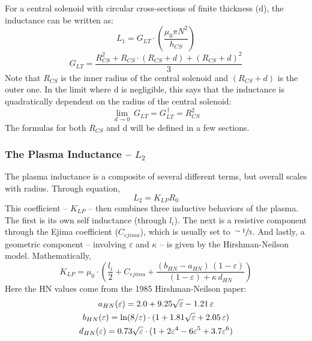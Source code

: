 For a central solenoid with circular cross-sections of finite thickness (d), the inductance can be written as: \cite{hartmann}
\begin{equation}
	L_1 = G_{LT} \cdot \left( \frac{\mu_0 \pi N^2}{h_{CS}} \right)
\end{equation}
\begin{equation}
	G_{LT} = \frac{R_{CS}^2 + R_{CS} \cdot ( R_{CS} + d ) + ( R_{CS} + d ) ^ 2 }{3}
\end{equation}
Note that $R_{CS}$ is the inner radius of the central solenoid and $( R_{CS} + d )$ is the outer one. In the limit where d is negligible, this says that the inductance is quadratically dependent on the radius of the central solenoid:
\begin{equation}
	\label{eq:glt_simple}
	\underset{d \to 0}{\lim} \ G_{LT} = G_{LT}^{\,\dagger} = R_{CS}^2
\end{equation}
The formulas for both $R_{CS}$ and d will be defined in a few sections.

\subsubsection{The Plasma Inductance -- $L_2$}

The plasma inductance is a composite of several different terms, but overall scales with radius. Through equation,
\begin{equation}
	L_2 = K_{LP} R_0
\end{equation}
This  coefficient -- $K_{LP}$ -- then combines three inductive behaviors of the plasma. The first is its own self inductance (through $l_i$). \cite{jeff} The next is a resistive component through the Ejima coefficient ($C_{ejima}$), which is usually set to $ \sfrac{\sim1}{3}$. \cite{process} And lastly, a geometric component -- involving $\varepsilon$ and $\kappa$ -- is given by the Hirshman-Neilson model. \cite{hn85} Mathematically,
\begin{equation}
	K_{LP} = \mu_0 \cdot \left( \frac{l_i}{2} + C_{ejima} + \frac{ ( b_{HN} - a_{HN} ) \, ( 1 - \varepsilon ) }{ ( 1 - \varepsilon ) + \kappa \, d_{HN} } \right)
\end{equation}
Here the HN values come from the 1985 Hirshman-Neilson paper:
\begin{gather}
	a_{HN}(\varepsilon) = 2.0 + 9.25 \sqrt{\varepsilon} - 1.21 \, \varepsilon \\
	b_{HN}(\varepsilon) = \textnormal{ln} (8/\varepsilon) \cdot ( 1 + 1.81 \sqrt{\varepsilon} + 2.05 \, \varepsilon ) \\
	d_{HN}(\varepsilon) = 0.73 \sqrt{\varepsilon}  \cdot ( 1 + 2 \varepsilon^4 - 6 \varepsilon^5 +3.7 \varepsilon^6 )
\end{gather}

